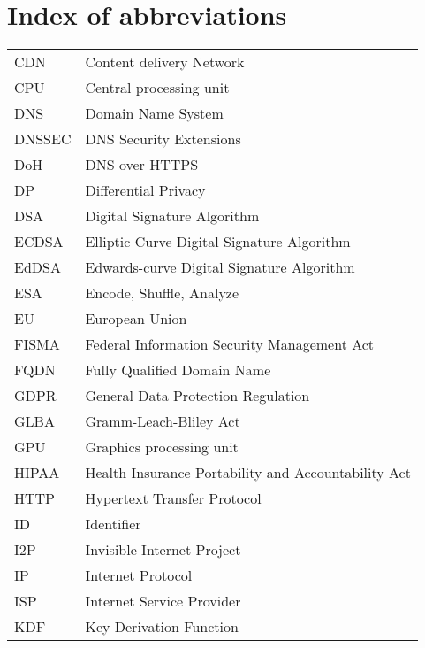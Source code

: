 \chapter*{Index of abbreviations}


\begin{longtable}{ p{}  p{} } 

CDN & Content delivery Network\\
CPU & Central processing unit\\
DNS & Domain Name System\\                                                       
DNSSEC &  DNS Security Extensions\\                                              
DoH & DNS over HTTPS\\                                                              
DP &    Differential Privacy\\    
DSA & Digital Signature Algorithm\\
ECDSA & Elliptic Curve Digital Signature Algorithm\\
EdDSA & Edwards-curve Digital Signature Algorithm\\
ESA & Encode, Shuffle, Analyze\\                                                    
EU &    European Union\\                                                            
FISMA & Federal Information Security Management Act\\                               
FQDN &  Fully Qualified Domain Name\\                                               
GDPR &  General Data Protection Regulation\\                                        
GLBA &  Gramm-Leach-Bliley Act\\
GPU & Graphics processing unit\\
HIPAA & Health Insurance Portability and Accountability Act\\
HTTP & Hypertext Transfer Protocol\\
ID & Identifier\\
I2P & Invisible Internet Project\\
IP & Internet Protocol\\
ISP & Internet Service Provider\\                                                   
KDF & Key Derivation Function\\

\end{longtable}
